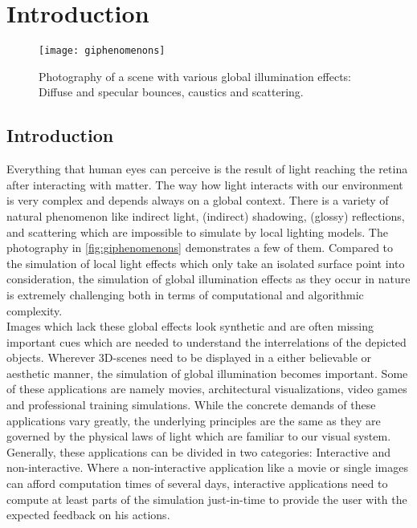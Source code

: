 \documentclass[thesis.tex]{subfiles}
\begin{document}
\chapter{Introduction}
\label{chap:introduction}

\begin{figure}[h]
\centering
\texttt{[image: giphenomenons]}
\caption{\cite{bib:RealtimeGIOverview} Photography of a scene with various global illumination effects: Diffuse and specular bounces, caustics and scattering.}
\label{fig:giphenomenons}
\end{figure}

\section{Introduction}
Everything that human eyes can perceive is the result of light reaching the retina after interacting with matter.
The way how light interacts with our environment is very complex and depends always on a global context.
There is a variety of natural phenomenon like indirect light, (indirect) shadowing, (glossy) reflections, and scattering which are impossible to simulate by local lighting models.
The photography in \autoref{fig:giphenomenons} demonstrates a few of them.
Compared to the simulation of local light effects which only take an isolated surface point into consideration, the simulation of global illumination effects as they occur in nature is extremely challenging both in terms of computational and algorithmic complexity.
\\
Images which lack these global effects look synthetic and are often missing important cues which are needed to understand the interrelations of the depicted objects.
Wherever 3D-scenes need to be displayed in a either believable or aesthetic manner, the simulation of global illumination becomes important.
Some of these applications are namely movies, architectural visualizations, video games and professional training simulations.
While the concrete demands of these applications vary greatly, the underlying principles are the same as they are governed by the physical laws of light which are familiar to our visual system.
\\
Generally, these applications can be divided in two categories: Interactive and non-interactive.
Where a non-interactive application like a movie or single images can afford computation times of several days, interactive applications need to compute at least parts of the simulation just-in-time to provide the user with the expected feedback on his actions.
\end{document}
